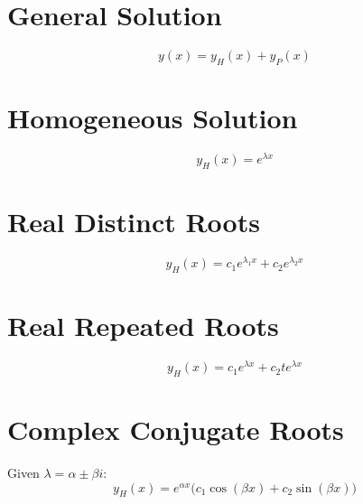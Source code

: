 \documentclass{article}
\begin{document}
\begin{multicols}{3}
    \section*{General Solution}
    \begin{equation*}
        y(x) = y_H(x) + y_P(x)
    \end{equation*}
    \section*{Homogeneous Solution}
    \begin{equation*}
        y_H(x) = e^{\lambda x}
    \end{equation*}
    \section*{Real Distinct Roots}
    \begin{equation*}
        y_H(x) = c_1e^{\lambda_1 x} + c_2e^{\lambda_2 x}
    \end{equation*}
    \section*{Real Repeated Roots}
    \begin{equation*}
        y_H(x) = c_1e^{\lambda x} + c_2 te^{\lambda x}
    \end{equation*}
    \section*{Complex Conjugate Roots}
    Given \(\lambda = \alpha \pm \beta i\):
    \begin{equation*}
        y_H(x) = e^{\alpha x}\bigl( c_1\cos{\left( \beta x \right)} + c_2 \sin{\left( \beta x \right)} \bigr)
    \end{equation*}

\end{multicols}
\end{document}
